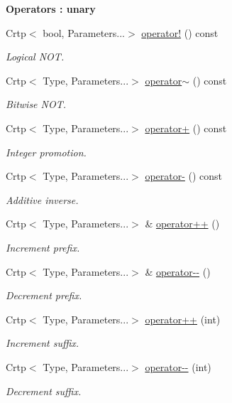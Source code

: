 \begin{Indent}{\bf Operators \-: unary}\par
\begin{DoxyCompactItemize}
\item 
Crtp$<$ bool, Parameters...$>$ \hyperlink{classmagrathea_1_1StaticVectorizer_a47cd06bd12e9a75244bb47949d2ac179}{operator!} () const 
\begin{DoxyCompactList}\small\item\em Logical N\-O\-T. \end{DoxyCompactList}\item 
Crtp$<$ Type, Parameters...$>$ \hyperlink{classmagrathea_1_1StaticVectorizer_a6aefc18480c79c379de8ddd9ebd0ac13}{operator$\sim$} () const 
\begin{DoxyCompactList}\small\item\em Bitwise N\-O\-T. \end{DoxyCompactList}\item 
Crtp$<$ Type, Parameters...$>$ \hyperlink{classmagrathea_1_1StaticVectorizer_a77d653a93df0b5f7f112651044604109}{operator+} () const 
\begin{DoxyCompactList}\small\item\em Integer promotion. \end{DoxyCompactList}\item 
Crtp$<$ Type, Parameters...$>$ \hyperlink{classmagrathea_1_1StaticVectorizer_a112a6fff4321f8e4ebe7184d4215e17a}{operator-\/} () const 
\begin{DoxyCompactList}\small\item\em Additive inverse. \end{DoxyCompactList}\item 
Crtp$<$ Type, Parameters...$>$ \& \hyperlink{classmagrathea_1_1StaticVectorizer_acc5094efe1b21c12c05543b2ee05f9ae}{operator++} ()
\begin{DoxyCompactList}\small\item\em Increment prefix. \end{DoxyCompactList}\item 
Crtp$<$ Type, Parameters...$>$ \& \hyperlink{classmagrathea_1_1StaticVectorizer_a3430773a46c0300aaadb38b2ce8e26af}{operator-\/-\/} ()
\begin{DoxyCompactList}\small\item\em Decrement prefix. \end{DoxyCompactList}\item 
Crtp$<$ Type, Parameters...$>$ \hyperlink{classmagrathea_1_1StaticVectorizer_a0db772662fda98f47909ed9c5ae6f61e}{operator++} (int)
\begin{DoxyCompactList}\small\item\em Increment suffix. \end{DoxyCompactList}\item 
Crtp$<$ Type, Parameters...$>$ \hyperlink{classmagrathea_1_1StaticVectorizer_acb5f5aec44c70c502f6f95c9ef2ac8ff}{operator-\/-\/} (int)
\begin{DoxyCompactList}\small\item\em Decrement suffix. \end{DoxyCompactList}\end{DoxyCompactItemize}
\end{Indent}
